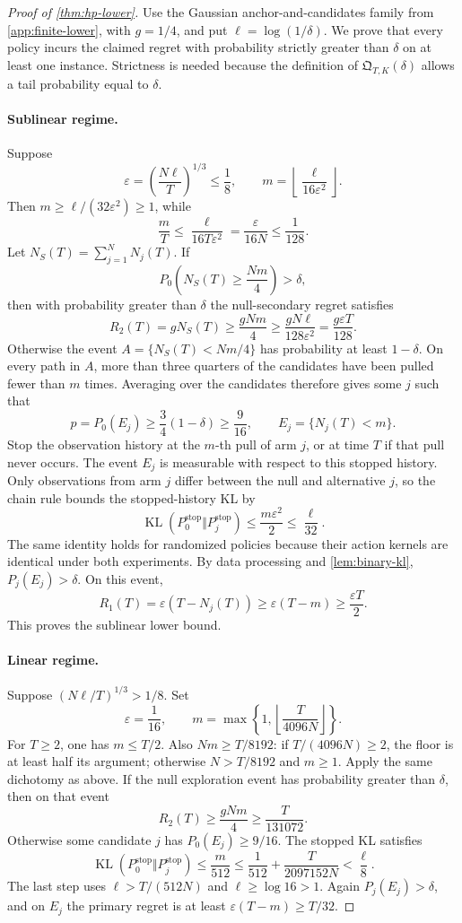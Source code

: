 \documentclass[11pt]{article}
\theoremstyle{definition}
\newcommand{\KL}{\operatorname{KL}}
\newcommand{\eps}{\varepsilon}
\begin{document}
\begin{proof}[Proof of \cref{thm:hp-lower}]
Use the Gaussian anchor-and-candidates family from
\cref{app:finite-lower}, with $g=1/4$, and put
$\ell=\log(1/\delta)$.  We prove that every policy incurs the claimed
regret with probability strictly greater than $\delta$ on at least one
instance.  Strictness is needed because the definition of
$\mathfrak Q_{T,K}(\delta)$ allows a tail probability equal to $\delta$.

\paragraph{Sublinear regime.}
Suppose
\[
 \eps=\left(\frac{N\ell}{T}\right)^{1/3}\le\frac18,
 \qquad
 m=\left\lfloor\frac{\ell}{16\eps^2}\right\rfloor.
\]
Then $m\ge\ell/(32\eps^2)\ge1$, while
\[
 \frac mT\le\frac{\ell}{16T\eps^2}
 =\frac{\eps}{16N}\le\frac1{128}.
\]
Let $N_S(T)=\sum_{j=1}^N N_j(T)$.  If
\[
 P_0\left(N_S(T)\ge\frac{Nm}{4}\right)>\delta,
\]
then with probability greater than $\delta$ the null-secondary regret
satisfies
\[
 R_2(T)=gN_S(T)\ge\frac{gNm}{4}
 \ge\frac{gN\ell}{128\eps^2}
 =\frac{g\eps T}{128}.
\]
Otherwise the event $A=\{N_S(T)<Nm/4\}$ has probability at least
$1-\delta$.  On every path in $A$, more than three quarters of the
candidates have been pulled fewer than $m$ times.  Averaging over the
candidates therefore gives some $j$ such that
\[
 p=P_0(E_j)\ge\frac34(1-\delta)\ge\frac9{16},
 \qquad E_j=\{N_j(T)<m\}.
\]
Stop the observation history at the $m$-th pull of arm $j$, or at time
$T$ if that pull never occurs.  The event $E_j$ is measurable with
respect to this stopped history.  Only observations from arm $j$ differ
between the null and alternative $j$, so the chain rule bounds the
stopped-history KL by
\[
 \KL(P_0^{\mathrm{stop}}\Vert P_j^{\mathrm{stop}})
 \le\frac{m\eps^2}{2}\le\frac{\ell}{32}.
\]
The same identity holds for randomized policies because their action
kernels are identical under both experiments.  By data processing and
\cref{lem:binary-kl}, $P_j(E_j)>\delta$.  On this event,
\[
 R_1(T)=\eps(T-N_j(T))\ge\eps(T-m)\ge\frac{\eps T}{2}.
\]
This proves the sublinear lower bound.

\paragraph{Linear regime.}
Suppose $(N\ell/T)^{1/3}>1/8$.  Set
\[
 \eps=\frac1{16},\qquad
 m=\max\left\{1,\left\lfloor\frac{T}{4096N}\right\rfloor\right\}.
\]
For $T\ge2$, one has $m\le T/2$.  Also $Nm\ge T/8192$: if
$T/(4096N)\ge2$, the floor is at least half its argument; otherwise
$N>T/8192$ and $m\ge1$.
Apply the same dichotomy as above.  If the null exploration event has
probability greater than $\delta$, then on that event
\[
 R_2(T)\ge\frac{gNm}{4}\ge\frac{T}{131072}.
\]
Otherwise some candidate $j$ has $P_0(E_j)\ge9/16$.  The stopped KL
satisfies
\[
 \KL(P_0^{\mathrm{stop}}\Vert P_j^{\mathrm{stop}})
 \le\frac m{512}
 \le\frac1{512}+\frac{T}{2097152N}
 <\frac{\ell}{8}.
\]
The last step uses $\ell>T/(512N)$ and $\ell\ge\log16>1$.
Again $P_j(E_j)>\delta$, and on $E_j$ the primary regret is at least
$\eps(T-m)\ge T/32$.


\end{proof}
\end{document}
